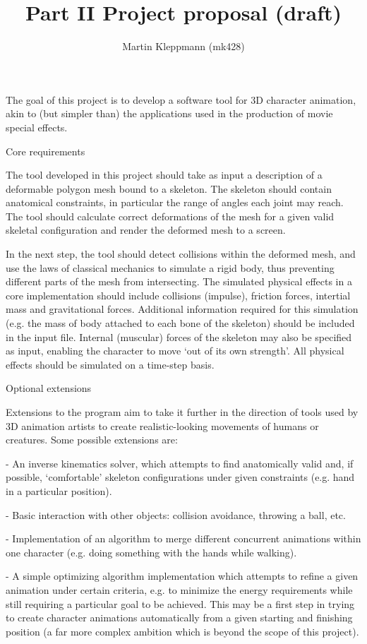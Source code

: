 \documentclass{article}
\begin{document}
\title{Part II Project proposal (draft)}
\author{Martin Kleppmann (mk428)}
\maketitle

The goal of this project is to develop a software tool for 3D character
animation, akin to (but simpler than) the applications used in the
production of movie special effects.


Core requirements

The tool developed in this project should take as input a description
of a deformable polygon mesh bound to a skeleton. The skeleton should
contain anatomical constraints, in particular the range of angles each
joint may reach. The tool should calculate correct deformations of the
mesh for a given valid skeletal configuration and render the deformed
mesh to a screen.

In the next step, the tool should detect collisions within the
deformed mesh, and use the laws of classical mechanics to simulate a
rigid body, thus preventing different parts of the mesh from
intersecting. The simulated physical effects in a core implementation
should include collisions (impulse), friction forces, intertial mass
and gravitational forces. Additional information required for this
simulation (e.g. the mass of body attached to each bone of the
skeleton) should be included in the input file. Internal (muscular)
forces of the skeleton may also be specified as input, enabling the
character to move `out of its own strength'. All physical effects
should be simulated on a time-step basis.


Optional extensions

Extensions to the program aim to take it further in the direction of
tools used by 3D animation artists to create realistic-looking
movements of humans or creatures. Some possible extensions are:

- An inverse kinematics solver, which attempts to find anatomically
  valid and, if possible, `comfortable' skeleton configurations under
  given constraints (e.g. hand in a particular position).

- Basic interaction with other objects: collision avoidance, throwing
  a ball, etc.

- Implementation of an algorithm to merge different concurrent
  animations within one character (e.g. doing something with the hands
  while walking).

- A simple optimizing algorithm implementation which attempts to
  refine a given animation under certain criteria, e.g. to minimize
  the energy requirements while still requiring a particular goal to
  be achieved. This may be a first step in trying to create character
  animations automatically from a given starting and finishing
  position (a far more complex ambition which is beyond the scope of
  this project).
\end{document}
